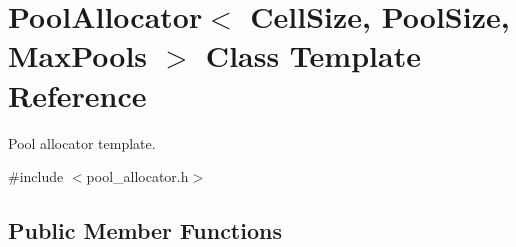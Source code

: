 \hypertarget{classPoolAllocator}{}\section{Pool\+Allocator$<$ Cell\+Size, Pool\+Size, Max\+Pools $>$ Class Template Reference}
\label{classPoolAllocator}


Pool allocator template.  




{\ttfamily \#include $<$pool\+\_\+allocator.\+h$>$}

\subsection*{Public Member Functions}
